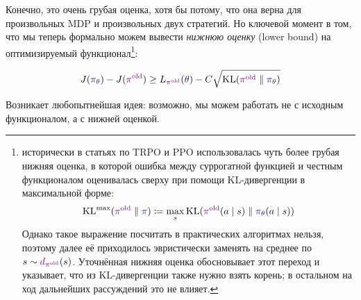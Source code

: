 Конечно, это очень грубая оценка, хотя бы потому, что она верна для произвольных MDP и произвольных двух стратегий. Но ключевой момент в том, что мы теперь формально можем вывести \emph{нижнюю оценку} (lower bound) на оптимизируемый функционал\footnote{исторически в статьях по TRPO и PPO использовалась чуть более грубая нижняя оценка, в которой ошибка между суррогатной функцией и честным функционалом оценивалась сверху при помощи KL-дивергенции в максимальной форме:
$$\KL^{\max}(\textcolor{ChadPurple}{\pi^{\old}} \parallel \textcolor{ChadBlue}{\pi}) \coloneqq \max_s \KL(\textcolor{ChadPurple}{\pi^{\old}}(a \mid s) \parallel \textcolor{ChadBlue}{\pi_\theta}(a \mid s))$$
Однако такое выражение посчитать в практических алгоритмах нельзя, поэтому далее её приходилось эвристически заменять на среднее по $s \HM\sim \textcolor{ChadPurple}{d_{\pi^{\old}}}(s)$. Уточнённая нижняя оценка обосновывает этот переход и указывает, что из KL-дивергенции также нужно взять корень; в остальном на ход дальнейших рассуждений это не влияет.
}:
\begin{theorem}
\begin{equation}\label{lowerbound}
J(\textcolor{ChadBlue}{\pi_\theta}) - J(\textcolor{ChadPurple}{\pi^{\old}}) \ge L_{\textcolor{ChadPurple}{\pi^{\old}}}(\textcolor{ChadBlue}{\theta}) - C \sqrt{\KL(\textcolor{ChadPurple}{\pi^{\old}} \parallel \textcolor{ChadBlue}{\pi_{\theta}})}
\end{equation}
\end{theorem}

Возникает любопытнейшая идея: возможно, мы можем работать не с исходным функционалом, а с нижней оценкой.

